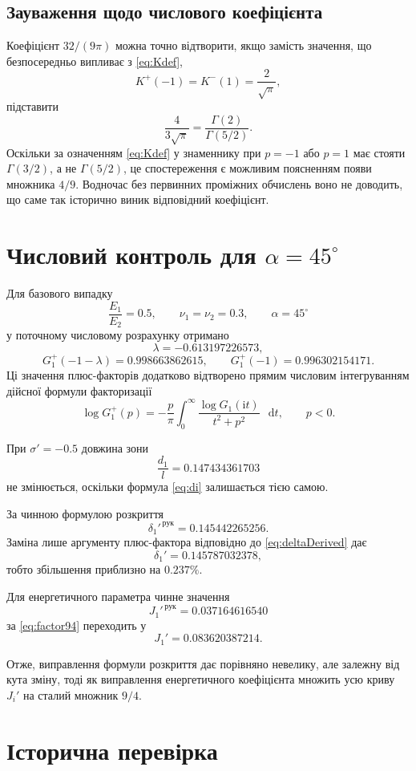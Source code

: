 \documentclass[12pt,a4paper]{article}
\newcommand{\ii}{\mathrm{i}}
\newcommand{\dd}{\mathop{}\!\mathrm{d}}
\begin{document}
\subsection*{Зауваження щодо числового коефіцієнта}

Коефіцієнт $32/(9\pi)$ можна точно відтворити, якщо замість
значення, що безпосередньо випливає з \eqref{eq:Kdef},
\[
  K^+(-1)=K^-(1)=\frac{2}{\sqrt{\pi}},
\]
підставити
\[
  \frac{4}{3\sqrt{\pi}}
  =
  \frac{\Gamma(2)}{\Gamma(5/2)}.
\]
Оскільки за означенням \eqref{eq:Kdef} у знаменнику при
$p=-1$ або $p=1$ має стояти $\Gamma(3/2)$, а не $\Gamma(5/2)$,
це спостереження є можливим поясненням появи множника $4/9$.
Водночас без первинних проміжних обчислень воно не доводить,
що саме так історично виник відповідний коефіцієнт.

\section{Числовий контроль для $\alpha=45^\circ$}

Для базового випадку
\[
  \frac{E_1}{E_2}=0.5,
  \qquad
  \nu_1=\nu_2=0.3,
  \qquad
  \alpha=45^\circ
\]
у поточному числовому розрахунку отримано
\[
  \lambda=-0.613197226573,
\]
\[
  G_1^+(-1-\lambda)=0.998663862615,
  \qquad
  G_1^+(-1)=0.996302154171.
\]
Ці значення плюс-факторів додатково відтворено прямим числовим
інтегруванням дійсної формули факторизації
\[
  \log G_1^+(p)
  =
  -\frac{p}{\pi}
  \int_0^\infty
  \frac{\log G_1(\ii t)}{t^2+p^2}\,\dd t,
  \qquad p<0.
\]

При $\sigma'=-0.5$ довжина зони
\[
  \frac{d_1}{l}=0.147434361703
\]
не змінюється, оскільки формула \eqref{eq:di} залишається тією самою.

За чинною формулою розкриття
\[
  \delta_1'^{\,\mathrm{рук}}
  =0.145442265256.
\]
Заміна лише аргументу плюс-фактора відповідно до
\eqref{eq:deltaDerived} дає
\[
  \boxed{
  \delta_1'=0.145787032378
  },
\]
тобто збільшення приблизно на $0.237\%$.

Для енергетичного параметра чинне значення
\[
  J_1'^{\,\mathrm{рук}}
  =0.037164616540
\]
за \eqref{eq:factor94} переходить у
\[
  \boxed{
  J_1'=0.083620387214
  }.
\]

Отже, виправлення формули розкриття дає порівняно невелику,
але залежну від кута зміну, тоді як виправлення енергетичного
коефіцієнта множить усю криву $J_i'$ на сталий множник $9/4$.

\section{Історична перевірка}
\end{document}
